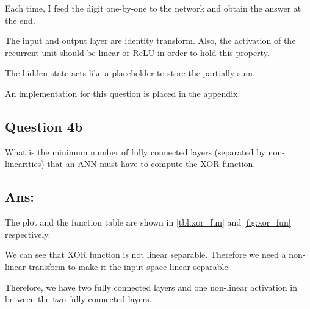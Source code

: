 \documentclass{kthreport}
\begin{document}
Each time, I feed the digit one-by-one to the network and obtain the answer at the end.

The input and output layer are identity transform.
Also, the activation of the recurrent unit should be linear or ReLU in order to hold
this property.

The hidden state acts like a placeholder to store the partially sum.

An implementation for this question is placed in the appendix.

\subsection{Question 4b}
What is the minimum number of fully connected layers (separated by non-linearities)
that an ANN must have to compute the XOR function.

\subsection*{Ans:}
The plot and the function table are shown in \cref{tbl:xor_fun} and \cref{fig:xor_fun}
respectively.

We can see that XOR function is not linear separable. Therefore we need a non-linear
transform to make it the input space linear separable.

Therefore, we have two fully connected layers and one non-linear activation in between
the two fully connected layers.
\end{document}
